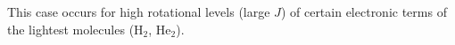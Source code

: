 This case occurs for high rotational levels (large $J$) of certain electronic terms of the lightest molecules ($\mathrm H_2$, $\mathrm{He}_2$).
